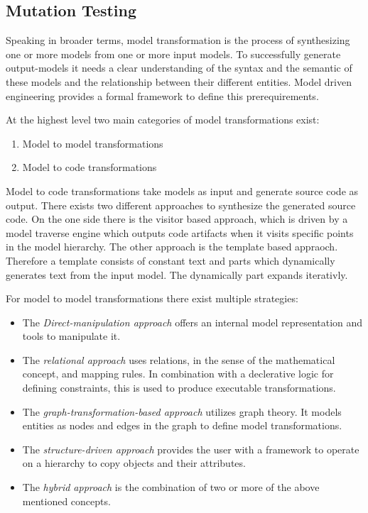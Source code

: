 \documentclass{llncs}
\begin{document}
\subsection{Mutation Testing}

Speaking in broader terms, model transformation is the process of synthesizing one or more models from one or more input models. To successfully generate output-models it needs a clear understanding of the syntax and the semantic of these models and the relationship between their different entities. Model driven engineering provides a formal framework to define this prerequirements.\cite{Sendall:2003}

At the highest level two main categories of model transformations exist:\cite{Czarnecki03}

\begin{enumerate}
	\item Model to model transformations
	\item Model to code transformations
\end{enumerate}

Model to code transformations take models as input and generate source code as output. There exists two different approaches to synthesize the generated source code. On the one side there is the visitor based approach, which is driven by a model traverse engine which outputs code artifacts when it visits specific points in the model hierarchy. The other approach is the template based appraoch. Therefore a template consists of constant text and parts which dynamically generates text from the input model. The dynamically part expands iterativly.\cite{Czarnecki03}


For model to model transformations there exist multiple strategies:

\begin{itemize}
	\item The \emph{Direct-manipulation approach} offers an internal model representation and tools to manipulate it.
	\item The \emph{relational approach} uses relations, in the sense of the mathematical concept, and mapping rules. In combination with a declerative logic for defining constraints, this is used to produce executable transformations.
	\item The \emph{graph-transformation-based approach} utilizes graph theory. It models entities as nodes and edges in the graph to define model transformations.
	\item The \emph{structure-driven approach} provides the user with a framework to operate on a hierarchy to copy objects and their attributes.
	\item The  \emph{hybrid approach} is the combination of two or more of the above mentioned concepts.
\end{itemize}
\end{document}
